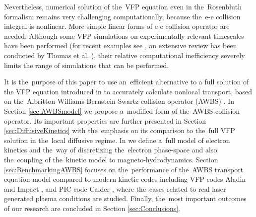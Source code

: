 
Nevertheless, numerical solution of the~VFP equation even in the~Rosenbluth
formalism remains very challenging computationally, because the~e-e collision
integral is nonlinear. More simple linear forms of e-e collision operator
are needed. Although some VFP simulations on experimentally relevant timescales 
have been performed (for recent examples see 
\cite{Hawreliak04,Ridgers08,Willingale10,Bissell10,Joglekar14,Joglekar16,Henchen_PRL2018}, 
an extensive review has been conducted by Thomas et al. \cite{Thomas13}), 
their relative computational inefficiency severely limits the range of 
simulations that can be performed.

It is the~purpose of this paper to use an~efficient alternative 
to a full solution of the VFP equation introduced in \cite{Sorbo_2015}
to accurately calculate nonlocal transport, 
based on the~Albritton-Williams-Bernstein-Swartz 
collision operator (AWBS) \cite{AWBS_PRL1986}.
In Section \ref{sec:AWBSmodel} we propose a~modified form of 
the~AWBS collision operator. Its important properties are further
presented in Section \ref{sec:DiffusiveKinetics} with the~emphasis on its
comparison to the~full VFP solution in the~local diffusive regime.
In  we define a~full model of electron kinetics and 
the~way of discretizing the~electron phase-space and also
the~coupling of the~kinetic model to magneto-hydrodynamics.
Section \ref{sec:BenchmarkingAWBS} focuses on the~performance of the~AWBS 
transport equation model compared to modern kinetic codes including VFP codes
Aladin and Impact \cite{Kingham_JCP2004}, and PIC code Calder 
\cite{Perez_PoP2012}, where the~cases related to real
laser generated plasma conditions are studied. Finally, the~most important
outcomes of our research are concluded in Section \ref{sec:Conclusions}. 
